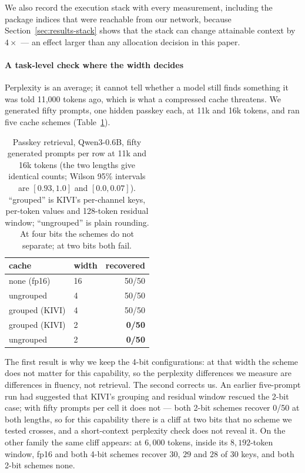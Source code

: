\documentclass[10pt,journal]{IEEEtran}
\begin{document}
We also record the execution stack with every measurement, including the package
indices that were reachable from our network, because
Section~\ref{sec:results-stack} shows that the stack can change attainable
context by $4\times$ --- an effect larger than any allocation decision in this
paper.


\paragraph*{A task-level check where the width decides}
Perplexity is an average; it cannot tell whether a model still finds something it
was told 11{,}000 tokens ago, which is what a compressed cache threatens. We
generated fifty prompts, one hidden passkey each, at 11k and 16k tokens, and ran
five cache schemes (Table~\ref{tab:passkey}).

\begin{table}[t]
\centering
\caption{Passkey retrieval, Qwen3-0.6B, fifty generated prompts per row at
11k and 16k tokens (the two lengths give identical counts; Wilson 95\% intervals
are $[0.93,1.0]$ and $[0.0,0.07]$). ``grouped'' is KIVI's per-channel keys,
per-token values and 128-token residual window; ``ungrouped'' is plain rounding.
At four bits the schemes do not separate; at two bits both fail.}
\label{tab:passkey}
\begin{tabular}{llr}
\toprule
cache & width & recovered \\
\midrule
none (fp16) & 16 & 50/50 \\
ungrouped & 4 & 50/50 \\
grouped (KIVI) & 4 & 50/50 \\
grouped (KIVI) & 2 & \textbf{0/50} \\
ungrouped & 2 & \textbf{0/50} \\
\bottomrule
\end{tabular}
\end{table}

The first result is why we keep the 4-bit configurations: at that width the scheme
does not matter for this capability, so the perplexity differences we measure are
differences in fluency, not retrieval. The second corrects us. An earlier five-prompt run had suggested that KIVI's grouping
and residual window rescued the 2-bit case; with fifty prompts per cell it does
not --- both 2-bit schemes recover 0/50 at both lengths, so for this capability
there is a cliff at two bits that no scheme we tested crosses, and a short-context
perplexity check does not reveal it.
On the other family the same cliff appears: at $6{,}000$ tokens, inside its
$8{,}192$-token window, fp16 and both 4-bit schemes recover $30$, $29$ and $28$ of $30$
keys, and both 2-bit schemes none.
\end{document}
